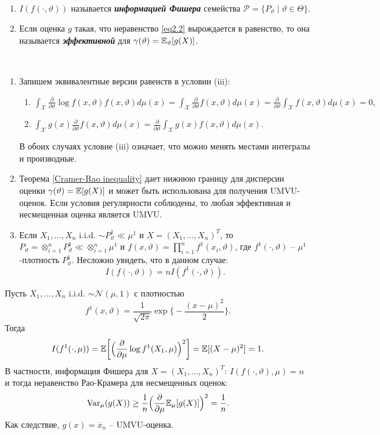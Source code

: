 \begin{defn} \
	\begin{enumerate}
		\item $I(f(\cdot, \vartheta))$ называется \textbf{\textit{информацией Фишера}} семейства $\mathcal{P}= \{P_\vartheta \mid \vartheta \in \Theta \}$.
		\item Если оценка $g$ такая, что неравенство \eqref{eq2.2} вырождается в равенство, то она называется \textbf{\textit{эффективной}} для $\gamma(\vartheta)=\mathbb{E}_\vartheta[g(X)]$.
	\end{enumerate}
\end{defn}

\begin{rmrk} \label{rmrk2.25} \
	\begin{enumerate}
		\item Запишем эквивалентные версии равенств в условии (iii):
		\begin{enumerate}
			\item $\int_\mathcal{X} \frac{\partial}{\partial \vartheta} \log f(x, \vartheta) f(x, \vartheta) d \mu(x) = \int_\mathcal{X} \frac{\partial}{\partial \vartheta} f(x, \vartheta) d \mu(x)=\frac{\partial}{\partial \vartheta}\int_\mathcal{X} f(x, \vartheta) d \mu(x) =0, $
			\item $\int_\mathcal{X} g(x) \frac{\partial}{\partial \vartheta} f(x, \vartheta) d\mu(x) = \frac{\partial}{\partial \vartheta} \int_\mathcal{X} g(x) f(x,\vartheta) d\mu(x).$
		\end{enumerate}
		В обоих случаях условие (iii) означает, что можно менять местами интегралы и производные.
		\item Теорема \ref{Cramer-Rao inequality} дает нижнюю границу для дисперсии оценки $\gamma(\vartheta) = \mathbb{E}[g(X)]$ и может быть использована для получения UMVU-оценок. Если условия регулярности соблюдены, то любая эффективная и несмещенная оценка является UMVU.
		\item Если $X_1, \dots, X_n$ i.i.d. $\sim P_\vartheta^1 \ll \mu^1$ и $X=(X_1, \dots, X_n)^T$, то $P_\vartheta = \otimes_{i=1}^nP_\vartheta^1 \ll \otimes_{i=1}^n\mu^1$ и $f(x,\vartheta)=\prod_{i=1}^n f^1(x_i, \vartheta)$, где $f^1(\cdot, \vartheta)$ -- $\mu^1$-плотность $P_\vartheta^1$. Несложно увидеть, что в данном случае:
		\[ I(f(\cdot, \vartheta))=nI(f^1(\cdot, \vartheta)).\]
	\end{enumerate}
\end{rmrk}

\begin{exmp}
	Пусть $X_1, \dots, X_n$ i.i.d. $\sim \mathcal{N}(\mu, 1)$ с плотностью
	\[ f^1(x,\vartheta)=\frac{1}{\sqrt{2\pi}} \exp\Big\{ -\frac{(x-\mu)^2}{2}\Big\} .\]
	Тогда
	\[ I(f^1(\cdot, \mu))=\mathbb{E}\bigg[ \Big( \frac{\partial}{\partial \mu} \log f^1(X_1, \mu) \Big)^2 \bigg] =\mathbb{E}[(X-\mu)^2]=1. \]
	В частности, информация Фишера для $X=(X_1, \dots, X_n)^T$: $I(f(\cdot, \vartheta),\mu)=n$ и тогда неравенство Рао-Крамера для несмещенных оценок:
	\[ \operatorname{Var}_\mu(g(X)) \geq \frac{1}{n} \Big( \frac{\partial}{\partial \mu} \mathbb{E}_\mu[g(X)] \Big)^2 = \frac{1}{n}. \]
	Как следствие, $g(x) = \overline{x}_n$ -- UMVU-оценка.
\end{exmp}

